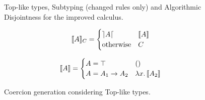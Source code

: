 \begin{figure}[t]




  \caption{Top-like types, Subtyping (changed rules only) and Algorithmic Disjointness for the improved calculus.}
  \label{fig:tltypesextdis}
\end{figure}

\begin{figure}[t]
  \[
  \llbracket A \rrbracket_{C} = 
  \begin{cases} 
        \rceil A \lceil & \llbracket A \rrbracket \\ 
        \text{otherwise} & {C} 
  \end{cases}
  \]

  \[
  \llbracket A \rrbracket = 
  \begin{cases} 
        A = \top & () \\
        A = A_1 \to A_2 & \lambda x.\, \llbracket A_2 \rrbracket \\
  \end{cases}
  \]


  \caption{Coercion generation considering Top-like types.}
  \label{fig:andcoercion}
\end{figure}

